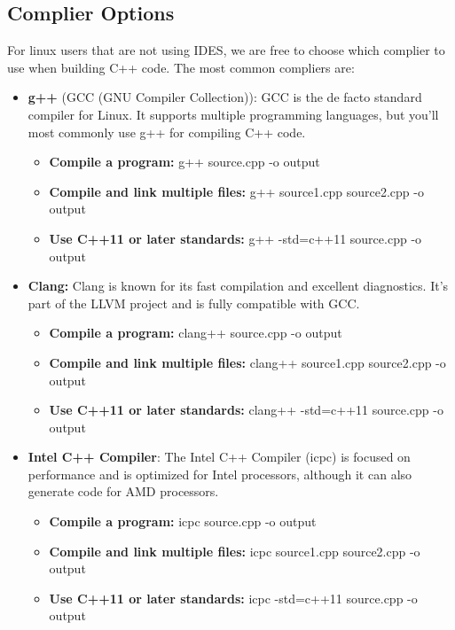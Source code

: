 \documentclass{report}
\begin{document}
    \bigbreak \noindent 
    \subsection{Complier Options}
    \bigbreak \noindent 
    For linux users that are not using IDES, we are free to choose which complier to use when building C++ code. The most common compliers are:
    \begin{itemize}
        \item \textbf{g++} (GCC (GNU Compiler Collection)): GCC is the de facto standard compiler for Linux. It supports multiple programming languages, but you'll most commonly use g++ for compiling C++ code.
            \begin{itemize}
                \item \textbf{Compile a program:} g++ source.cpp -o output
                \item \textbf{Compile and link multiple files:} g++ source1.cpp source2.cpp -o output
                \item \textbf{Use C++11 or later standards:} g++ -std=c++11 source.cpp -o output
            \end{itemize}
        \item \textbf{Clang:} Clang is known for its fast compilation and excellent diagnostics. It's part of the LLVM project and is fully compatible with GCC.
            \begin{itemize}
                \item \textbf{Compile a program:} clang++ source.cpp -o output
                \item \textbf{Compile and link multiple files:} clang++ source1.cpp source2.cpp -o output
                \item \textbf{Use C++11 or later standards:} clang++ -std=c++11 source.cpp -o output
            \end{itemize}
        \item \textbf{Intel C++ Compiler}: The Intel C++ Compiler (icpc) is focused on performance and is optimized for Intel processors, although it can also generate code for AMD processors.
            \begin{itemize}
                \item \textbf{Compile a program:} icpc source.cpp -o output
                \item \textbf{Compile and link multiple files:} icpc source1.cpp source2.cpp -o output
                \item \textbf{Use C++11 or later standards:} icpc -std=c++11 source.cpp -o output
            \end{itemize}
    \end{itemize}
\end{document}
